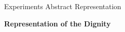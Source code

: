 \documentclass[aspectratio=169, 9pt]{beamer}
\theoremstyle{definition}
\begin{document}
\iffalse
\begin{frame}{Experiments Abstract Representation}
  \begin{center}
    \bf Representation of the Dignity
  \end{center}
  \begin{columns}
    \begin{column}{0.5\textwidth}
      \begin{figure}[h!]
        \centering
      \end{figure}
    \end{column}
    \begin{column}{0.5\textwidth}
      \begin{figure}[h!]
        \centering
      \end{figure}
    \end{column}
  \end{columns}
\end{frame}
\end{document}

